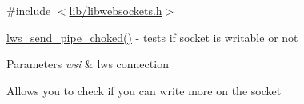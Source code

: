 {\ttfamily \#include $<$\hyperlink{libwebsockets_8h}{lib/libwebsockets.\+h}$>$}

\hyperlink{group__wsstatus_ga2bb3655329b4651cd06f79ee3a764421}{lws\+\_\+send\+\_\+pipe\+\_\+choked()} -\/ tests if socket is writable or not 
\begin{DoxyParams}{Parameters}
{\em wsi} & lws connection\\
\hline
\end{DoxyParams}
Allows you to check if you can write more on the socket 